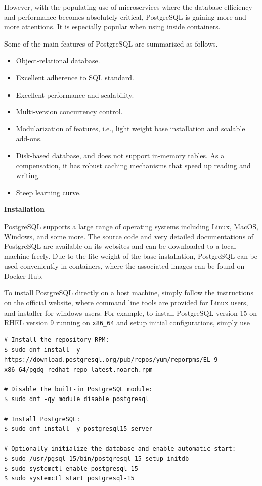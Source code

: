 However, with the populating use of microservices where the database efficiency and performance becomes absolutely critical, PostgreSQL is gaining more and more attentions. It is especially popular when using inside containers.

Some of the main features of PostgreSQL are summarized as follows.
\begin{itemize}
	\item Object-relational database.
	\item Excellent adherence to SQL standard.
	\item Excellent performance and scalability.
	\item Multi-version concurrency control.
	\item Modularization of features, i.e., light weight base installation and scalable add-ons.
	\item Disk-based database, and does not support in-memory tables. As a compensation, it has robust caching mechanisms that speed up reading and writing.
	\item Steep learning curve.
\end{itemize}

\vspace{0.1in}
\noindent \textbf{Installation}
\vspace{0.1in}

PostgreSQL supports a large range of operating systems including Linux, MacOS, Windows, and some more. The source code and very detailed documentations of PostgreSQL are available on its websites and can be downloaded to a local machine freely. Due to the lite weight of the base installation, PostgreSQL can be used conveniently in containers, where the associated images can be found on Docker Hub.

To install PostgreSQL directly on a host machine, simply follow the instructions on the official website, where command line tools are provided for Linux users, and installer for windows users. For example, to install PostgreSQL version 15 on RHEL version 9 running on \verb|x86_64| and setup initial configurations, simply use
\begin{lstlisting}
# Install the repository RPM:
$ sudo dnf install -y https://download.postgresql.org/pub/repos/yum/reporpms/EL-9-x86_64/pgdg-redhat-repo-latest.noarch.rpm

# Disable the built-in PostgreSQL module:
$ sudo dnf -qy module disable postgresql

# Install PostgreSQL:
$ sudo dnf install -y postgresql15-server

# Optionally initialize the database and enable automatic start:
$ sudo /usr/pgsql-15/bin/postgresql-15-setup initdb
$ sudo systemctl enable postgresql-15
$ sudo systemctl start postgresql-15
\end{lstlisting}

